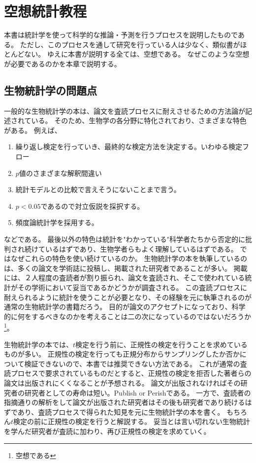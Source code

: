 \chapter{空想統計教程}
本書は統計学を使って科学的な推論・予測を行うプロセスを説明したものである。
ただし、このプロセスを通して研究を行っている人は少なく、類似書がほとんどない。
ゆえに本書が説明する全ては、空想である。
なぜこのような空想が必要であるのかを本章で説明する。

\section{生物統計学の問題点}
一般的な生物統計学の本は、論文を査読プロセスに耐えさせるための方法論が記述されている。
そのため、生物学の各分野に特化されており、さまざまな特色がある。
例えば、
\begin{enumerate}
    \item 繰り返し検定を行っていき、最終的な検定方法を決定する。いわゆる検定フロー
    \item $p$値のさまざまな解釈間違い
    \item 統計モデルとの比較で言えそうにないことまで言う。
    \item $p<0.05$であるので対立仮説を採択する。
    \item 頻度論統計学を採用する。
\end{enumerate}
などである。
最後以外の特色は統計を"わかっている"科学者たちから否定的に批判され続けているはずであり、生物学者らもよく理解しているはずである。
ではなぜこれらの特色を使い続けているのか。
生物統計学の本を執筆しているのは、多くの論文を学術誌に投稿し、掲載された研究者であることが多い。
掲載には、２人程度の査読者が割り振られ、論文を査読され、そこで使われている統計がその学術において妥当であるかどうかが調査される。
この査読プロセスに耐えられるように統計を使うことが必要となり、その経験を元に執筆されるのが通常の生物統計学の書籍だろう。
目的が論文のアクセプトになっており、科学的に何をするべきなのかを考えることは二の次になっているのではないだろうか\footnote{空想である}。

生物統計学の本では、$t$検定を行う前に、正規性の検定を行うことを求めているものが多い。
正規性の検定を行っても正規分布からサンプリングしたか否かについて検証できないので、本書では推奨できない方法である。
これが通常の査読プロセスで要求されているものだとすると、正規性の検定を拒否した著者らの論文は出版されにくくなることが予想される。
論文が出版されなければその研究者の研究者としての寿命は短い。Publish or Perishである。
一方で、査読者の指摘通りの解析をして論文が出版された研究者はその後も研究者であり続けるはずであり、査読プロセスで得られた知見を元に生物統計学の本を書く。
もちろん$t$検定の前に正規性の検定を行うと解説する。
妥当とは言い切れない生物統計を学んだ研究者が査読に加わり、再び正規性の検定を求めていく。



